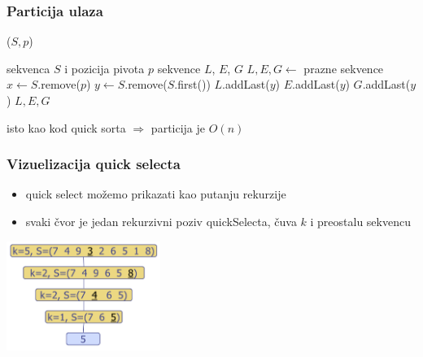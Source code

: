 \documentclass[compress,aspectratio=169]{beamer}
\begin{document}
\begin{frame}
  \frametitle{Particija ulaza}
  ($S, p$)
  \begin{algorithmic}
    \REQUIRE sekvenca $S$ i pozicija pivota $p$
    \ENSURE sekvence $L$, $E$, $G$
    \STATE $L,E,G \leftarrow$ prazne sekvence
    \STATE $x \leftarrow S$.remove($p$) 
      \STATE $y \leftarrow S$.remove($S$.first())
        \STATE $L$.addLast($y$)
        \STATE $E$.addLast($y$)
      \ELSE 
        \STATE $G$.addLast($y$)
      \ENDIF
    \ENDWHILE
    \RETURN $L,E,G$
  \end{algorithmic}
  \hfill isto kao kod quick sorta $\Rightarrow$ particija je $O(n)$    
\end{frame}

\begin{frame}[fragile]
  \frametitle{Vizuelizacija quick selecta}
  \begin{itemize}
    \item quick select možemo prikazati kao putanju rekurzije
    \item svaki čvor je jedan rekurzivni poziv quickSelecta, čuva $k$ i preostalu sekvencu
  \end{itemize}
  \begin{center}
    \includegraphics[width=5cm]{asp-12-pic37.png}
  \end{center}
\end{frame}
\end{document}
